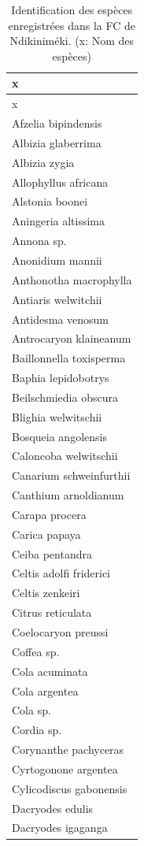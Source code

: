\documentclass[
  12pt,
  a4paper,
  extrafontsizes,
  onecolumn,
  openright]{book}
\theoremstyle{definition}
\theoremstyle{definition}
\theoremstyle{definition}
\theoremstyle{definition}
\theoremstyle{remark}
\begin{document}
\begin{longtable}[]{@{}l@{}}
\caption{\label{tab:Especes-Ndikinimeki3}Identification des espèces enregistrées dans la FC de Ndikiniméki. (x: Nom des espèces)}\tabularnewline
\toprule()
x \\
\midrule()
\endfirsthead
\toprule()
x \\
\midrule()
\endhead
Afzelia bipindensis \\
Albizia glaberrima \\
Albizia zygia \\
Allophyllus africana \\
Alstonia boonei \\
Aningeria altissima \\
Annona sp. \\
Anonidium mannii \\
Anthonotha macrophylla \\
Antiaris welwitchii \\
Antidesma venosum \\
Antrocaryon klaineanum \\
Baillonnella toxisperma \\
Baphia lepidobotrys \\
Beilschmiedia obscura \\
Blighia welwitschii \\
Bosqueia angolensis \\
Caloncoba welwitschii \\
Canarium schweinfurthii \\
Canthium arnoldianum \\
Carapa procera \\
Carica papaya \\
Ceiba pentandra \\
Celtis adolfi friderici \\
Celtis zenkeiri \\
Citrus reticulata \\
Coelocaryon preussi \\
Coffea sp. \\
Cola acuminata \\
Cola argentea \\
Cola sp. \\
Cordia sp. \\
Corynanthe pachyceras \\
Cyrtogonone argentea \\
Cylicodiscus gabonensis \\
Dacryodes edulis \\
Dacryodes igaganga \\

\end{longtable}
\end{document}
